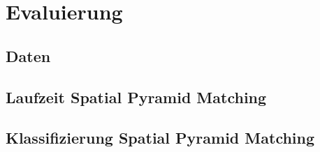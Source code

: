 \newpage
\section{Evaluierung}

\subsection{Daten}

\subsection{Laufzeit Spatial Pyramid Matching}

\subsection{Klassifizierung Spatial Pyramid Matching}
